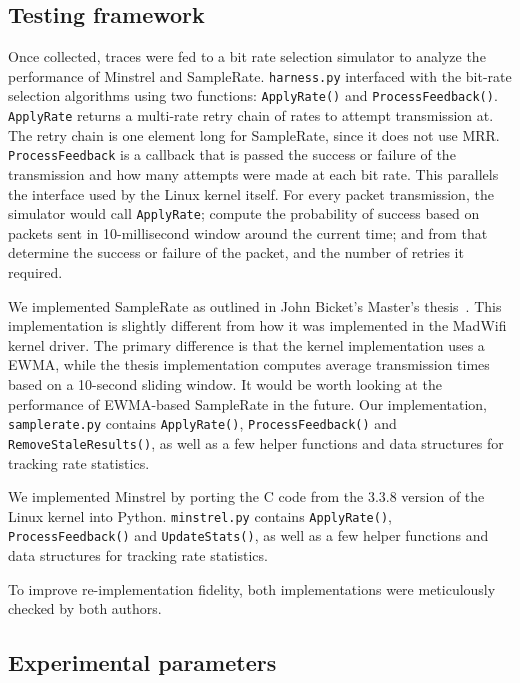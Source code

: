 \documentclass[twocolumn,10pt]{article}
\begin{document}
\subsection{Testing framework}

Once collected, traces were fed to a bit rate selection simulator to 
analyze the performance of Minstrel and SampleRate. 
\texttt{harness.py} interfaced with the bit-rate selection algorithms using
two functions: \texttt{ApplyRate()} and \texttt{ProcessFeedback()}.
\texttt{ApplyRate} returns a multi-rate retry chain of rates to attempt 
transmission at. The retry chain is one element long for SampleRate, since it
does not use MRR. \texttt{ProcessFeedback} is a callback that is passed 
the success or failure of the transmission and how many attempts were made
at each bit rate. This parallels the interface used by the Linux kernel 
itself. For every packet transmission, the simulator would call 
\texttt{ApplyRate}; compute the probability of success based on packets 
sent in 10-millisecond window around the current time; and from that 
determine the success or failure of the packet, and the number of retries 
it required. 

We implemented SampleRate as outlined in John Bicket's Master's
thesis~\cite{samplerate}.  This implementation is slightly different
from how it was implemented in the MadWifi kernel driver.  The primary
difference is that the kernel implementation uses a EWMA, while the
thesis implementation computes average transmission times based on a
10-second sliding window.  It would be worth looking at the
performance of EWMA-based SampleRate in the future.  Our
implementation, \texttt{samplerate.py} contains \texttt{ApplyRate()},
\texttt{ProcessFeedback()} and \texttt{RemoveStaleResults()}, as well
as a few helper functions and data structures for tracking rate
statistics.

We implemented Minstrel by porting the C code from the 3.3.8 version
of the Linux kernel into Python.  \texttt{minstrel.py} contains
\texttt{ApplyRate()}, \texttt{ProcessFeedback()} and
\texttt{UpdateStats()}, as well as a few helper functions and data
structures for tracking rate statistics.

To improve re-implementation fidelity, both implementations were meticulously checked by both authors.


\subsection{Experimental parameters}
\end{document}
